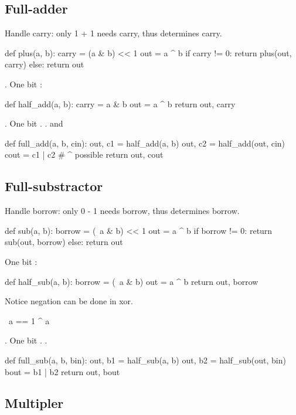 \subsection{Full-adder}
 Handle carry: only 1 + 1 needs carry, thus  determines carry. 
\begin{python}
def plus(a, b):
  carry = (a & b) << 1
  out = a ^ b 
  if carry != 0:
    return plus(out, carry)
  else:
    return out
\end{python}
. One bit :
\begin{python}
def half_add(a, b): 
  carry = a & b
  out   = a ^ b 
  return out, carry 
\end{python}
. One bit . . and 
\begin{python}
def full_add(a, b, cin): 
  out, c1 = half_add(a, b)
  out, c2 = half_add(out, cin)
  cout    = c1 | c2  # ^ possible
  return out, cout 
\end{python}

\subsection{Full-substractor}
 Handle borrow: only 0 - 1 needs borrow, thus  determines borrow. 
\begin{python}
def sub(a, b):
  borrow = (~a & b) << 1
  out = a ^ b 
  if borrow != 0:
    return sub(out, borrow)
  else:
    return out
\end{python}
 One bit :
\begin{python}
def half_sub(a, b):
  borrow = (~a & b)
  out = a ^ b
  return out, borrow
\end{python}
Notice negation can be done in xor. 
\begin{python}
~a == 1 ^ a 
\end{python}
. One bit . . 
\begin{python}
def full_sub(a, b, bin):
  out, b1 = half_sub(a, b)
  out, b2 = half_sub(out, bin)
  bout = b1 | b2 
  return out, bout 
\end{python}

\subsection{Multipler}


